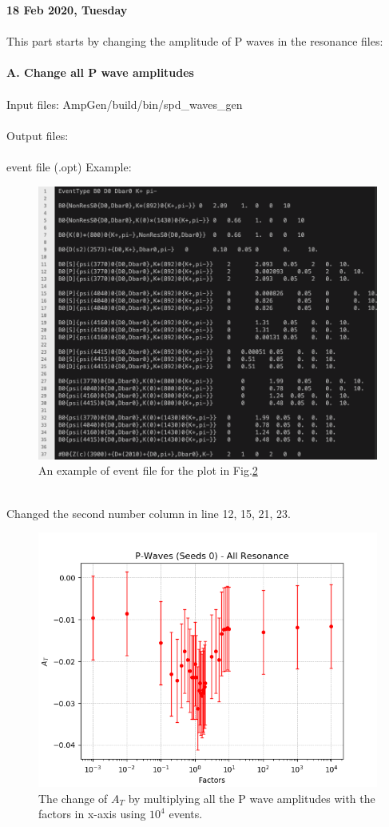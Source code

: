\clearpage
\noindent\textbf{18 Feb 2020, Tuesday}
\\
\\
This part starts by changing the amplitude of P waves in the resonance files:
\\
\\
\textbf{A. Change all P wave amplitudes}
\\
\\
\indent Input files: AmpGen/build/bin/spd\_waves\_gen 
\\
\\
\indent Output files: 
\\
\\
event file (.opt) Example:
\begin{figure}[h]
\center
\includegraphics*[width=0.96\linewidth]{p_wave/event_info_p_10000}
\caption{An example of event file for the plot in Fig.\ref{at_pwave_all_10000}}
\label{event_info_p_10000}
\end{figure}
\\
Changed the second number column in line 12, 15, 21, 23.
\clearpage
\begin{figure}[h]
\center
\includegraphics*[width=0.96\linewidth]{p_wave/at_pwave_all_10000}
\caption{The change of $A_T$ by multiplying all the P wave amplitudes with the factors in x-axis using $10^4$ events.}
\label{at_pwave_all_10000}
\end{figure}
